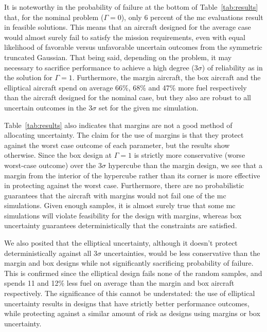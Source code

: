 It is noteworthy in the probability of failure at the bottom of Table~\ref{tab:results} that,
for the nominal problem ($\Gamma = 0$),
only 6 percent of the \gls{mc} evaluations result in feasible solutions.
This means that an aircraft designed for the average case would almost surely
fail to satisfy the mission requirements, even with equal likelihood of favorable versus
unfavorable uncertain outcomes from the symmetric truncated Gaussian.
That being said, depending on the problem, it may necessary to sacrifice
performance to achieve a high degree ($3\sigma$) of
reliability as in the solution for $\Gamma = 1$. Furthermore, the margin aircraft, the box aircraft
and the elliptical aircraft spend on average 66\%, 68\% and 47\% more fuel respectively
than the aircraft designed for the nominal case, but they also are
robust to all uncertain outcomes in the $3\sigma$ set for the given \gls{mc} simulation.

Table~\ref{tab:results} also indicates that margins are not a good method of
allocating uncertainty. The claim for the use of margins is that they protect against
the worst case outcome of each parameter, but the results show otherwise.
Since the box design at $\Gamma=1$ is strictly
more conservative (worse worst-case outcome) over the $3\sigma$ hypercube
than the margin design, we see that a margin from the interior of the hypercube
rather than its corner is more effective in protecting against the worst case.
Furthermore, there are no probabilistic
guarantees that the aircraft
with margins would not fail one of the \gls{mc} simulations. Given enough samples,
it is almost surely true that some \gls{mc} simulations will violate feasibility
for the design with margins,
whereas box uncertainty guarantees deterministically that the constraints are satisfied.

We also posited that the elliptical uncertainty, although it doesn't
protect deterministically against all $3\sigma$ uncertainties, would be less conservative than the
margin and box designs while not significantly sacrificing probability of failure. This is
confirmed since the elliptical design fails none of the random samples,
and spends 11 and 12\% less fuel on average
than the margin and box aircraft respectively.
The significance of this cannot be understated: the use of elliptical uncertainty
results in designs that have strictly better performance outcomes, while protecting
against a similar amount of risk as designs using margins or box uncertainty.

